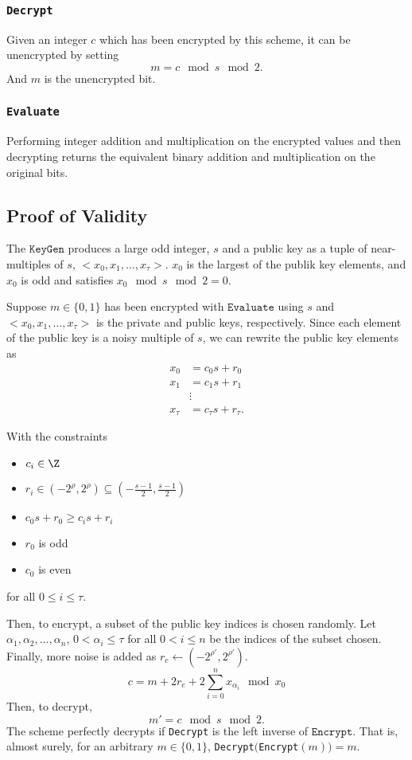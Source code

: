 \documentclass[a4paper,11pt, oneside]{article}
\begin{document}
\subsubsection{\texttt{Decrypt}}
Given an integer $c$ which has been encrypted by this scheme, it can be unencrypted by setting
\[m = c\mod{s}\mod{2}.\]
And $m$ is the unencrypted bit.

\subsubsection{\texttt{Evaluate}}
Performing integer addition and multiplication on the encrypted values and then decrypting returns the equivalent binary addition and multiplication on the original bits.

\subsection{Proof of Validity}\label{sec:proof}
The $\texttt{KeyGen}$ produces a large odd integer, $s$ and a public key as a tuple of near-multiples of $s$, $<x_0,x_1,\dots,x_\tau>$.  $x_0$ is the largest of the publik key elements, and $x_0$ is odd and satisfies $x_0\mod{s}\mod{2} = 0$.

Suppose $m\in\{0,1\}$ has been encrypted with $\texttt{Evaluate}$ using $s$ and $<x_0,x_1,\dots,x_\tau>$ is the private and public keys, respectively.  Since each element of the public key is a noisy multiple of $s$, we can rewrite the public key elements as 
\begin{align*}
    x_0 &= c_0s+r_0\\
    x_1 &= c_1s+r_1\\
    &\vdots\\
    x_\tau &= c_\tau s+r_\tau.
\end{align*}

With the constraints
\begin{itemize}
    \item $c_i\in\Z$
    \item $r_i\in (-2^\rho,2^\rho)\subseteq \left( -\frac{s-1}{2}, \frac{s-1}{2} \right)$
    \item $c_0s + r_0 \geq c_is+r_i$
    \item $r_0$ is odd
    \item $c_0$ is even
\end{itemize}
for all $ 0 \leq i \leq \tau$.

Then, to encrypt, a subset of the public key indices is chosen randomly.  Let $\alpha_1,\alpha_2,\dots,\alpha_n$, $0 < \alpha_i \leq \tau$ for all $0 < i \leq n$ be the indices of the subset chosen.  Finally, more noise is added as $r_e \leftarrow (-2^{\rho'}, 2^{\rho'})$.
\[c = m + 2r_e + 2\sum_{i=0}^n x_{\alpha_i}\mod{x_0}\]
Then, to decrypt, 
\[m' = c\mod{s}\mod{2}.\]
The scheme perfectly decrypts if \texttt{Decrypt} is the left inverse of $\texttt{Encrypt}$.  That is, almost surely, for an arbitrary $m\in\{0,1\}$, \texttt{Decrypt}$($\texttt{Encrypt}$(m)) = m$.
\end{document}
